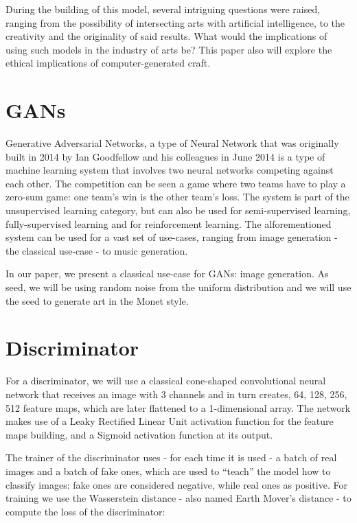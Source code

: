 \documentclass[conference]{IEEEtran}
\begin{document}
    During the building of this model, several intriguing questions were raised, ranging from the possibility of intersecting
arts with artificial intelligence, to the creativity and the originality of said results. What would the implications of using
such models in the industry of arts be? This paper also will explore the ethical implications of computer-generated craft.

\section{GANs}
    Generative Adversarial Networks, a type of Neural Network that was originally built in 2014 by Ian Goodfellow and his
colleagues in June 2014 \cite{b1} is a type of machine learning system that involves two neural networks competing against
each other. The competition can be seen a game where two teams have to play a zero-sum game: one team's win is the other
team's loss. The system is part of the unsupervised learning category, but can also be used for semi-supervised learning,
fully-supervised learning and for reinforcement learning. The alforementioned system can be used for a vast set of use-cases,
ranging from image generation - the classical use-case - to music generation.

    In our paper, we present a classical use-case for GANs: image generation. As seed, we will be using random noise from
the uniform distribution and we will use the seed to generate art in the Monet style.

\section{Discriminator}
    For a discriminator, we will use a classical cone-shaped convolutional neural network that receives an image with 3 channels
and in turn creates, 64, 128, 256, 512 feature maps, which are later flattened to a 1-dimensional array. The network makes use
of a Leaky Rectified Linear Unit activation function for the feature maps building, and a Sigmoid activation function at its
output.

    The trainer of the discriminator uses - for each time it is used - a batch of real images and a batch of fake ones, which are used
to ``teach'' the model how to classify images: fake ones are considered negative, while real ones as positive. For training we use
the Wasserstein distance - also named Earth Mover's distance - to compute the loss of the discriminator:
\end{document}
